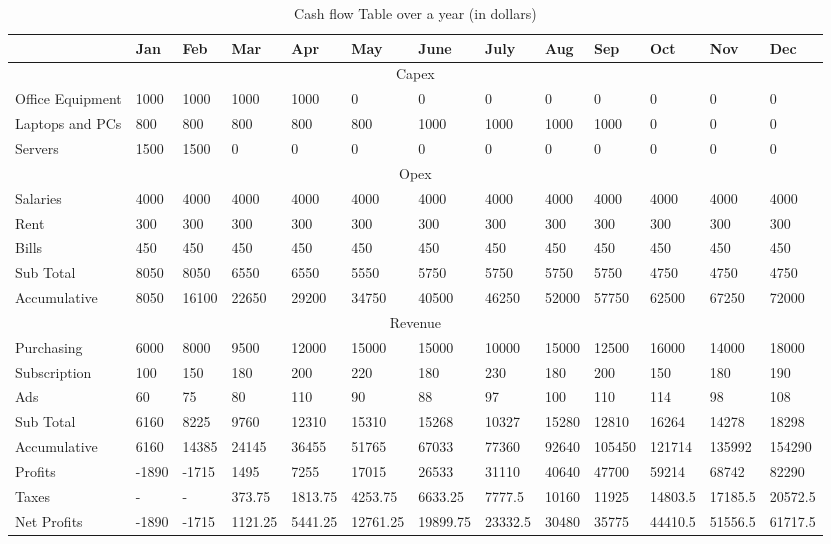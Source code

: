 \begin{table}[H]
\centering
\small
\caption{Cash flow Table over a year (in dollars)}
\begin{adjustbox}{angle=90}
\begin{tabular}[t]{ | l | l | l | l | l | l | l | l | l | l | l | l | l |}
\hline
 & Jan & Feb & Mar & Apr & May & June & July & Aug & Sep & Oct & Nov & Dec \\
\hline \hline
\multicolumn{13}{|c|}{Capex}  \\
\hline
Office Equipment & 1000 & 1000 & 1000 & 1000 & 0 & 0 & 0 & 0 & 0 & 0 & 0 & 0 \\
\hline
Laptops and PCs & 800 & 800 & 800 & 800 & 800 & 1000 & 1000 & 1000 & 1000 & 0 & 0 & 0 \\
\hline
Servers & 1500 & 1500 & 0 & 0 & 0 & 0 & 0 & 0 & 0 & 0 & 0 & 0 \\
\hline
\multicolumn{13}{|c|}{Opex}  \\
\hline
Salaries & 4000 & 4000 & 4000 & 4000 & 4000 & 4000 & 4000 & 4000 & 4000 & 4000 & 4000 & 4000 \\
\hline
Rent & 300 & 300 & 300 & 300 & 300 & 300 & 300 & 300 & 300 & 300 & 300 & 300 \\
\hline
Bills & 450 & 450 & 450 & 450 & 450 & 450 & 450 & 450 & 450 & 450 & 450 & 450 \\
\hline
Sub Total & 8050 & 8050 & 6550 & 6550 & 5550 & 5750 & 5750 & 5750 & 5750 & 4750 & 4750 & 4750 \\
\hline
Accumulative & 8050 & 16100 & 22650 & 29200 & 34750 & 40500 & 46250 & 52000 & 57750 & 62500 & 67250 & 72000 \\
\hline
\multicolumn{13}{|c|}{Revenue}  \\
\hline
Purchasing & 6000 & 8000 & 9500 & 12000 & 15000 & 15000 & 10000 & 15000 & 12500 & 16000 & 14000 & 18000 \\
\hline
Subscription & 100 & 150 & 180 & 200 & 220 & 180 & 230 & 180 & 200 & 150 & 180 & 190 \\
\hline
Ads & 60 & 75 & 80 & 110 & 90 & 88 & 97 & 100 & 110 & 114 & 98 & 108 \\
\hline
Sub Total  & 6160 & 8225 & 9760 & 12310 & 15310 & 15268 & 10327 & 15280 & 12810 & 16264 & 14278 & 18298 \\
\hline
Accumulative & 6160 & 14385 & 24145 & 36455 & 51765 & 67033 & 77360 & 92640 & 105450 & 121714 & 135992 & 154290 \\
\hline
Profits & -1890 & -1715 & 1495 & 7255 & 17015 & 26533 & 31110 & 40640 & 47700 & 59214 & 68742 & 82290  \\
\hline
Taxes & - & - & 373.75 & 1813.75 & 4253.75 & 6633.25 & 7777.5 & 10160 & 11925 & 14803.5 & 17185.5 & 20572.5 \\
\hline
Net Profits & -1890 & -1715 & 1121.25 & 5441.25 & 12761.25 & 19899.75 & 23332.5 & 30480 & 35775 & 44410.5 & 51556.5 & 61717.5 \\
\hline
\end{tabular}
\end{adjustbox}
\label{tab:cash_flow}
\end{table}
